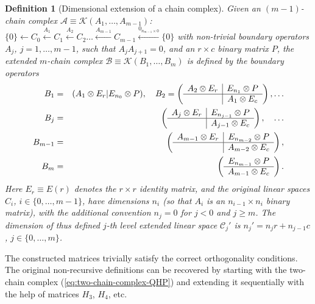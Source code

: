 \documentclass[aps,prb,12pt,tightenlines,%
notitlepage,longbibliography]{revtex4-1}
\newtheorem{definition}[theorem]{Definition}
\begin{document}
\begin{definition}[Dimensional extension of a chain complex]
  \label{def:dim-ext} Given an $(m-1)$-chain complex
  $\mathcal{A}\equiv\mathcal{K}(A_1,\ldots,A_{m-1})$:
  $\{0\}\leftarrow C_0\stackrel{A_1}\leftarrow
  C_1\stackrel{A_2}\leftarrow C_2\ldots \stackrel{A_{m-1}}\leftarrow
  C_{m-1}\stackrel{0_{n_{m-1}\times 0}}\leftarrow \{0\}$ with
  non-trivial boundary operators $A_j$, $j=1,\ldots,m-1$, such that
  $A_jA_{j+1}=0$, and an $r\times c$ binary matrix $P$, the extended
  $m$-chain complex $\mathcal{B}\equiv\mathcal{K}(B_1,\ldots ,B_m)$ is
  defined by the boundary operators
  \begin{eqnarray}
    \label{eq:B1}
    B_1&=&(A_1\otimes E_{r}|E_{n_0}\otimes P),\quad 
           B_2=\left(
           \begin{array}[c]{c|c}
             A_2\otimes E_r&E_{n_1}\otimes P\\ \hline
                           & A_1\otimes E_c
           \end{array}\right), \ldots\\ 
    \label{eq:Bj}
    B_j&=&\left(
           \begin{array}[c]{c|c}
             A_j\otimes E_r&E_{n_{j-1}}\otimes P\\ \hline
                           & A_{j-1}\otimes E_c
           \end{array}\right), \quad \ldots\\
    B_{m-1}&=&\left(
               \begin{array}[c]{c|c}
                 A_{m-1}\otimes E_r&E_{n_{m-2}}\otimes P\\ \hline
                                   & A_{m-2}\otimes E_c
               \end{array}\right),\\ \label{eq:Blast}
    B_m&=&\left(
           \begin{array}[c]{c}
             E_{n_{m-1}}\otimes P\\  \hline        A_{m-1}\otimes E_c
           \end{array}\right).
  \end{eqnarray}
  Here $E_r\equiv E(r)$ denotes the $r\times r$ identity matrix, and
  the original linear spaces $C_i$, $i\in\{0,\ldots,m-1\}$, have
  dimensions $n_i$ (so that $A_i$ is an $n_{i-1}\times n_i$ binary
  matrix), with the additional convention $n_{j}=0$ for $j<0$ and
  $j\ge m$.  The dimension of thus defined $j$-th level extended
  linear space $\mathcal{C}_j'$ is $n_j'=n_j r+n_{j-1} c$,
  $j\in\{0,\ldots,m\}$.
\end{definition}
The constructed matrices trivially satisfy the correct orthogonality
conditions.  The original non-recursive definitions can be recovered
by starting with the two-chain complex
(\ref{eq:two-chain-complex-QHP}) and extending it sequentially with
the help of matrices $H_3$, $H_4$, etc.
\end{document}
